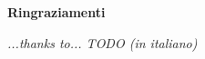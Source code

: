 \thispagestyle{empty}

\begin{center}
  {\bf \Huge Ringraziamenti}
\end{center}

\vspace{4cm}


\emph{
  ...thanks to... TODO (in italiano)
}


